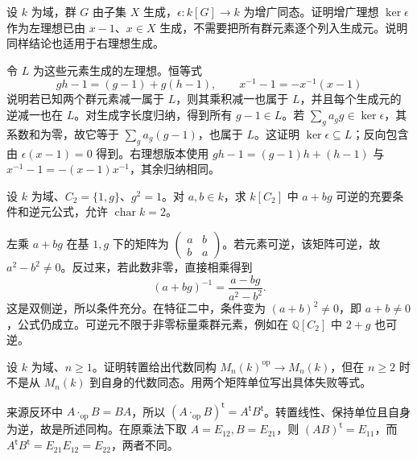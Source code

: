 \begin{exercise}\label{b2:ex:11-augmentation-generators}
	设 \(k\) 为域，群 \(G\) 由子集 \(X\) 生成，\(\epsilon:k[G]\to k\) 为增广同态。证明增广理想 \(\ker\epsilon\) 作为左理想已由 \(x-1\)、\(x\in X\) 生成，不需要把所有群元素逐个列入生成元。说明同样结论也适用于右理想生成。
\end{exercise}
\begin{solution}
	令 \(L\) 为这些元素生成的左理想。恒等式
	\[
		gh-1=(g-1)+g(h-1),\qquad x^{-1}-1=-x^{-1}(x-1)
	\]
	说明若已知两个群元素减一属于 \(L\)，则其乘积减一也属于 \(L\)，并且每个生成元的逆减一也在 \(L\)。对生成字长度归纳，得到所有 \(g-1\in L\)。若 \(\sum_g a_gg\in\ker\epsilon\)，其系数和为零，故它等于 \(\sum_g a_g(g-1)\)，也属于 \(L\)。这证明 \(\ker\epsilon\subseteq L\)；反向包含由 \(\epsilon(x-1)=0\) 得到。右理想版本使用 \(gh-1=(g-1)h+(h-1)\) 与 \(x^{-1}-1=-(x-1)x^{-1}\)，其余归纳相同。
\end{solution}

\begin{exercise}\label{b2:ex:11-cyclic-two-units}
	设 \(k\) 为域、\(C_2=\{1,g\}\)、\(g^2=1\)。对 \(a,b\in k\)，求 \(k[C_2]\) 中 \(a+bg\) 可逆的充要条件和逆元公式，允许 \(\operatorname{char}k=2\)。
\end{exercise}
\begin{solution}
	左乘 \(a+bg\) 在基 \(1,g\) 下的矩阵为 \(\begin{pmatrix}a&b\\b&a\end{pmatrix}\)。若元素可逆，该矩阵可逆，故 \(a^2-b^2\ne0\)。反过来，若此数非零，直接相乘得到
	\[
		(a+bg)^{-1}=\frac{a-bg}{a^2-b^2}.
	\]
	这是双侧逆，所以条件充分。在特征二中，条件变为 \((a+b)^2\ne0\)，即 \(a+b\ne0\)，公式仍成立。可逆元不限于非零标量乘群元素，例如在 \(\mathbb Q[C_2]\) 中 \(2+g\) 也可逆。
\end{solution}

\begin{exercise}\label{b2:ex:11-matrix-opposite}
	设 \(k\) 为域、\(n\ge1\)。证明转置给出代数同构 \(M_n(k)^{\mathrm{op}}\to M_n(k)\)，但在 \(n\ge2\) 时不是从 \(M_n(k)\) 到自身的代数同态。用两个矩阵单位写出具体失败等式。
\end{exercise}
\begin{solution}
	来源反环中 \(A\cdot_{\mathrm{op}}B=BA\)，所以 \((A\cdot_{\mathrm{op}}B)^{\mathsf t}=A^{\mathsf t}B^{\mathsf t}\)。转置线性、保持单位且自身为逆，故是所述同构。在原乘法下取 \(A=E_{12},B=E_{21}\)，则 \((AB)^{\mathsf t}=E_{11}\)，而 \(A^{\mathsf t}B^{\mathsf t}=E_{21}E_{12}=E_{22}\)，两者不同。
\end{solution}

